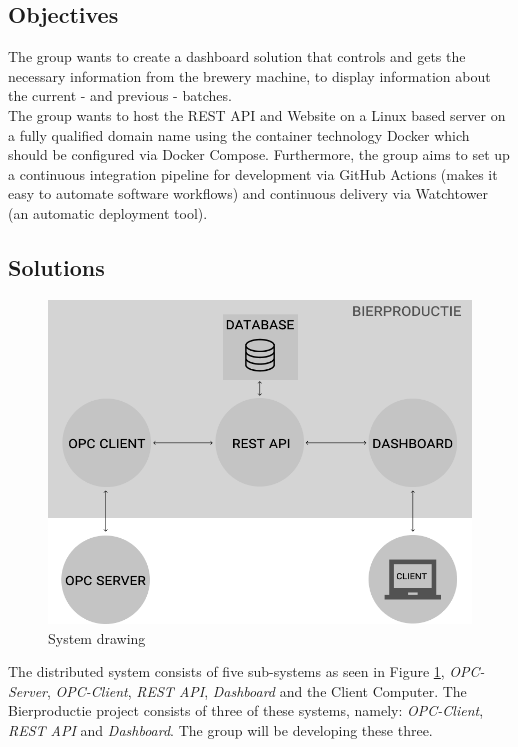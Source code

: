 \subsection{Objectives}
The group wants to create a dashboard solution that controls and gets the
necessary information from the brewery machine, to display information about the
current - and previous - batches.\\

The group wants to host the REST API and Website on a Linux based server on a
fully qualified domain name using the container technology Docker which should
be configured via Docker Compose. Furthermore, the group aims to set up a
continuous integration pipeline for development via GitHub Actions (makes it
easy to automate software workflows) and continuous delivery via Watchtower (an
automatic deployment tool).

\subsection{Solutions}
\begin{figure}[h]
\centering 
\includegraphics[scale=0.3]{images/system_overview.png}
\caption{System drawing} 
\label{figure:system_drawing}
\end{figure}

The distributed system consists of five sub-systems as seen in Figure
\ref{figure:system_drawing}, \textit{OPC-Server}, \textit{OPC-Client},
\textit{REST API}, \textit{Dashboard} and the Client Computer. The Bierproductie
project consists of three of these systems, namely: \textit{OPC-Client},
\textit{REST API} and \textit{Dashboard}. The group will be developing these
three.

